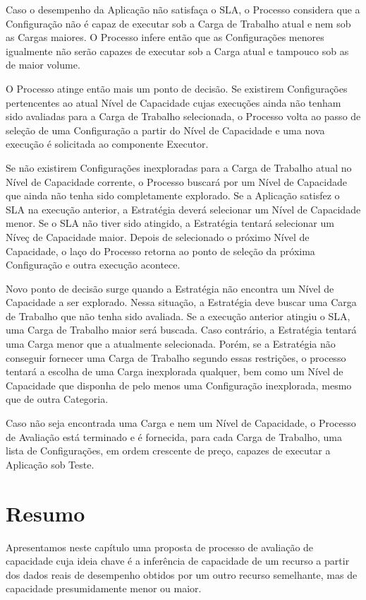Caso o desempenho da Aplicação não satisfaça o SLA, o Processo considera que a 
Configuração não é capaz de executar sob a Carga de Trabalho atual e nem sob as
Cargas maiores. O Processo infere então que as Configurações menores igualmente
não serão capazes de executar sob a Carga atual e tampouco sob as de maior volume.

O Processo atinge então mais um ponto de decisão. Se existirem Configurações
pertencentes ao atual Nível de Capacidade cujas execuções ainda não tenham sido 
avaliadas para a Carga de Trabalho selecionada, o Processo volta ao passo de 
seleção de uma Configuração a partir do Nível de Capacidade e uma nova execução
é solicitada ao componente Executor.

Se não existirem Configurações inexploradas para a Carga de Trabalho atual no
Nível de Capacidade corrente, o Processo buscará por um Nível de Capacidade que 
ainda não tenha sido completamente explorado. Se a Aplicação satisfez o SLA na 
execução anterior, a Estratégia deverá selecionar um Nível de Capacidade menor. 
Se o SLA não tiver sido atingido, a Estratégia tentará selecionar um  Níveç de 
Capacidade maior. Depois de selecionado o próximo Nível de Capacidade, o laço do
Processo retorna ao ponto de seleção da próxima Configuração e outra execução 
acontece.
   
Novo ponto de decisão surge quando a Estratégia não encontra um Nível de 
Capacidade a ser explorado. Nessa situação, a Estratégia deve buscar uma Carga 
de Trabalho que não tenha sido avaliada. Se a execução anterior atingiu o SLA,
uma Carga de Trabalho maior será buscada. Caso contrário, a Estratégia tentará
uma Carga menor que a atualmente selecionada. Porém, se a Estratégia não conseguir 
fornecer uma Carga de Trabalho segundo essas restrições, o processo tentará a 
escolha de uma Carga inexplorada qualquer, bem como um Nível de Capacidade que 
disponha de pelo menos uma Configuração inexplorada, mesmo que de outra Categoria.    

Caso não seja encontrada uma Carga e nem um Nível de Capacidade, o Processo de 
Avaliação está terminado e é fornecida, para cada Carga de Trabalho, uma lista 
de Configurações, em ordem crescente de preço, capazes de executar a Aplicação 
sob Teste.  

\section{Resumo}
Apresentamos neste capítulo uma proposta de processo de avaliação de capacidade
cuja ideia chave é a inferência de capacidade de um recurso a partir dos dados 
reais de desempenho obtidos por um outro recurso semelhante, mas de capacidade
presumidamente menor ou maior.

